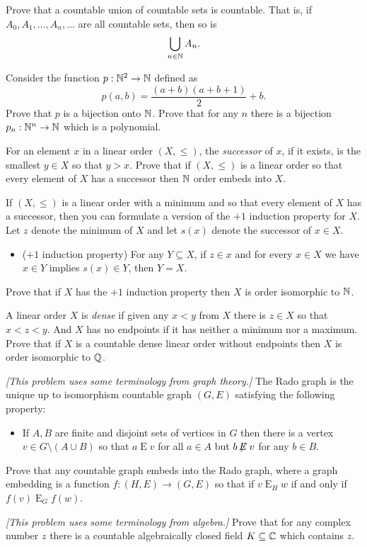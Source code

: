 \documentclass[10pt]{amsart}
\begin{document}
\begin{problem}
Prove that a countable union of countable sets is countable. That is, if $A_0, A_1, \ldots, A_n, \ldots$ are all countable sets, then so is
\[
\bigcup_{n \in \mathbb{N}} A_n.
\]
\end{problem}


\begin{problem}
Consider the function $p : \mathbb{N}^2 \to \mathbb{N}$ defined as 
\[
p(a,b) = \frac{(a+b)(a+b+1)}{2} + b.
\]
Prove that $p$ is a bijection onto $\mathbb{N}$. Prove that for any $n$ there is a bijection $p_n : \mathbb{N}^n \to \mathbb{N}$ which is a polynomial.
\end{problem}


\begin{problem}
For an element $x$ in a linear order $(X,\le)$, the \emph{successor} of $x$, if it exists, is the smallest $y \in X$ so that $y > x$. Prove that if $(X,\le)$ is a linear order so that every element of $X$ has a successor then $\mathbb{N}$ order embeds into $X$.
\end{problem}

\begin{problem}
If $(X,\le)$ is a linear order with a minimum and so that every element of $X$ has a successor, then you can formulate a version of the $+1$ induction property for $X$. Let $z$ denote the minimum of $X$ and let $s(x)$ denote the successor of $x \in X$.
\begin{itemize}
\item ($+1$ induction property) For any $Y \subseteq X$, if $z \in x$ and for every $x \in X$ we have $x \in Y$ implies $s(x) \in Y$, then $Y = X$.
\end{itemize}
Prove that if $X$ has the $+1$ induction property then $X$ is order isomorphic to $\mathbb{N}$.
\end{problem}

\begin{problem}
A linear order $X$ is \emph{dense} if given any $x < y$ from $X$ there is $z \in X$ so that $x < z < y$. And $X$ has no endpoints if it has neither a minimum nor a maximum. Prove that if $X$ is a countable dense linear order without endpoints then $X$ is order isomorphic to $\mathbb{Q}$. 
\end{problem}

\newcommand\E{\mathbin{E}}
\newcommand\notE{\mathbin{\not\!\!E}}
\begin{problem}
\emph{[This problem uses some terminology from graph theory.]}
The Rado graph is the unique up to isomorphism countable graph $(G,E)$ satisfying the following property:
\begin{itemize}
\item If $A,B$ are finite and disjoint sets of vertices in $G$ then there is a vertex $v \in G \setminus (A \cup B)$ so that $a \E v$ for all $a \in A$ but $b \notE v$ for any $b \in B$.
\end{itemize}
Prove that any countable graph embeds into the Rado graph, where a graph embedding is a function $f : (H,E) \to (G,E)$ so that if $v \E_H w$ if and only if $f(v) \E_G f(w)$.
\end{problem}

\begin{problem}
\emph{[This problem uses some terminology from algebra.]}
Prove that for any complex number $z$ there is a countable algebraically closed field $K \subseteq \mathbb{C}$ which contains $z$.
\end{problem}
\end{document}
